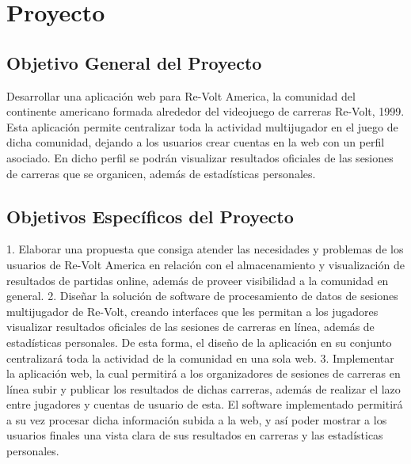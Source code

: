 \chapter{Proyecto}

\section{Objetivo General del Proyecto}
Desarrollar una aplicación web para Re-Volt America, la comunidad del continente americano formada alrededor del videojuego de carreras Re-Volt, 1999. Esta aplicación permite centralizar toda la actividad multijugador en el juego de dicha comunidad, dejando a los usuarios crear cuentas en la web con un perfil asociado. En dicho perfil se podrán visualizar resultados oficiales de las sesiones de carreras que se organicen, además de estadísticas personales.

\section{Objetivos Específicos del Proyecto}
1.	Elaborar una propuesta que consiga atender las necesidades y problemas de los usuarios de Re-Volt America en relación con el almacenamiento y visualización de resultados de partidas online, además de proveer visibilidad a la comunidad en general.
2.	Diseñar la solución de software de procesamiento de datos de sesiones multijugador de Re-Volt, creando interfaces que les permitan a los jugadores visualizar resultados oficiales de las sesiones de carreras en línea, además de estadísticas personales. De esta forma, el diseño de la aplicación en su conjunto centralizará toda la actividad de la comunidad en una sola web.
3.	Implementar la aplicación web, la cual permitirá a los organizadores de sesiones de carreras en línea subir y publicar los resultados de dichas carreras, además de realizar el lazo entre jugadores y cuentas de usuario de esta. El software implementado permitirá a su vez procesar dicha información subida a la web, y así poder mostrar a los usuarios finales una vista clara de sus resultados en carreras y las estadísticas personales.

